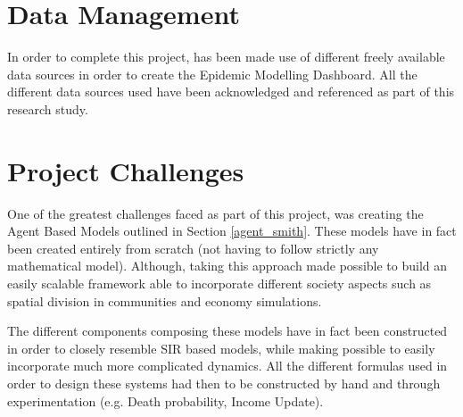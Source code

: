 \section{Data Management}
In order to complete this project, has been made use of different freely available data sources in order to create the Epidemic Modelling Dashboard. All the different data sources used have been acknowledged and referenced as part of this research study. 

\section{Project Challenges}
One of the greatest challenges faced as part of this project, was creating the Agent Based Models outlined in Section \ref{agent_smith}. These models have in fact been created entirely from scratch (not having to follow strictly any mathematical model). Although, taking this approach made possible to build an easily scalable framework able to incorporate different society aspects such as spatial division in communities and economy simulations. 

The different components composing these models have in fact been constructed in order to closely resemble SIR based models, while making possible to easily incorporate much more complicated dynamics. All the different formulas used in order to design these systems had then to be constructed by hand and through experimentation (e.g. Death probability, Income Update).